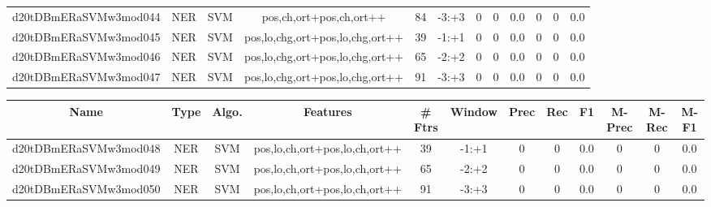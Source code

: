 \documentclass[a4paper]{article}
\begin{document}
\begin{landscape}
\begin{center}
\begin{tabular}{ |c|c|c|c|c|c|c|c|c|c|c|c|}
 
 	
 	\small{ d20tDBmERaSVMw3mod044 } & \small{ NER} & \small{  SVM }  & pos,ch,ort+pos,ch,ort++  &  84 &  \small{  -3:+3 }  &  0 & 0 & 0.0  &  0 & 0 & 0.0 \\
 	

 
 	
 	\small{ d20tDBmERaSVMw3mod045 } & \small{ NER} & \small{  SVM }  & pos,lo,chg,ort+pos,lo,chg,ort++  &  39 &  \small{  -1:+1 }  &  0 & 0 & 0.0  &  0 & 0 & 0.0 \\
 	

 
 	
 	\small{ d20tDBmERaSVMw3mod046 } & \small{ NER} & \small{  SVM }  & pos,lo,chg,ort+pos,lo,chg,ort++  &  65 &  \small{  -2:+2 }  &  0 & 0 & 0.0  &  0 & 0 & 0.0 \\
 	

 
 	
 	\small{ d20tDBmERaSVMw3mod047 } & \small{ NER} & \small{  SVM }  & pos,lo,chg,ort+pos,lo,chg,ort++  &  91 &  \small{  -3:+3 }  &  0 & 0 & 0.0  &  0 & 0 & 0.0 \\
 	
 \hline
\end{tabular}
\end{center}




\begin{center}
\begin{tabular}{ |c|c|c|c|c|c|c|c|c|c|c|c|} 
 \hline
 	Name & Type & Algo. & Features & \# Ftrs & Window & Prec & Rec & F1 & M-Prec & M-Rec & M-F1\\
 \hline

 	

 
 	
 	\small{ d20tDBmERaSVMw3mod048 } & \small{ NER} & \small{  SVM }  & pos,lo,ch,ort+pos,lo,ch,ort++  &  39 &  \small{  -1:+1 }  &  0 & 0 & 0.0  &  0 & 0 & 0.0 \\
 	

 
 	
 	\small{ d20tDBmERaSVMw3mod049 } & \small{ NER} & \small{  SVM }  & pos,lo,ch,ort+pos,lo,ch,ort++  &  65 &  \small{  -2:+2 }  &  0 & 0 & 0.0  &  0 & 0 & 0.0 \\
 	

 
 	
 	\small{ d20tDBmERaSVMw3mod050 } & \small{ NER} & \small{  SVM }  & pos,lo,ch,ort+pos,lo,ch,ort++  &  91 &  \small{  -3:+3 }  &  0 & 0 & 0.0  &  0 & 0 & 0.0 \\
 	


\end{tabular}
\end{center}
\end{landscape}
\end{document}
